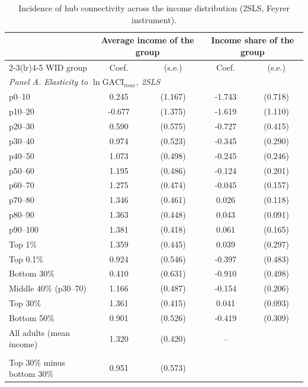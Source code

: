 \begin{table}[p]
\centering
\caption{Incidence of hub connectivity across the income distribution (2SLS, Feyrer instrument).}
\label{tab:incidence}
\begin{threeparttable}
\small
\begin{tabular}{lcccc}
\toprule
 & \multicolumn{2}{c}{Average income of the group} & \multicolumn{2}{c}{Income share of the group} \\
\cmidrule(lr){2-3}\cmidrule(lr){4-5}
WID group & Coef. & (s.e.) & Coef. & (s.e.) \\
\midrule
\multicolumn{5}{l}{\emph{Panel A. Elasticity to $\ln\mathrm{GACI}_{max}$, 2SLS}}\\
p0--10 & 0.245 & (1.167) & -1.743\sym{**} & (0.718) \\
p10--20 & -0.677 & (1.375) & -1.619 & (1.110) \\
p20--30 & 0.590 & (0.575) & -0.727\sym{*} & (0.415) \\
p30--40 & 0.974\sym{*} & (0.523) & -0.345 & (0.290) \\
p40--50 & 1.073\sym{**} & (0.498) & -0.245 & (0.246) \\
p50--60 & 1.195\sym{**} & (0.486) & -0.124 & (0.201) \\
p60--70 & 1.275\sym{***} & (0.474) & -0.045 & (0.157) \\
p70--80 & 1.346\sym{***} & (0.461) & 0.026 & (0.118) \\
p80--90 & 1.363\sym{***} & (0.448) & 0.043 & (0.091) \\
p90--100 & 1.381\sym{***} & (0.418) & 0.061 & (0.165) \\
Top 1\% & 1.359\sym{***} & (0.445) & 0.039 & (0.297) \\
Top 0.1\% & 0.924\sym{*} & (0.546) & -0.397 & (0.483) \\
Bottom 30\% & 0.410 & (0.631) & -0.910\sym{*} & (0.498) \\
Middle 40\% (p30--70) & 1.166\sym{**} & (0.487) & -0.154 & (0.206) \\
Top 30\% & 1.361\sym{***} & (0.415) & 0.041 & (0.093) \\
Bottom 50\% & 0.901\sym{*} & (0.526) & -0.419 & (0.309) \\
All adults (mean income) & 1.320\sym{***} & (0.420) & -- &  \\
\addlinespace
\multicolumn{5}{l}{\emph{Panel B. Differences between groups (difference outcomes)}}\\
Top 30\% minus bottom 30\% & 0.951\sym{*} & (0.573) & & \\

\end{tabular}
\end{threeparttable}
\end{table}

